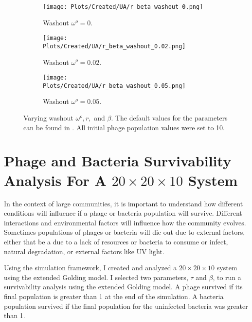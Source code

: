 \begin{figure}[]
    \centering
    \begin{subfigure}{0.49\linewidth}
        \centering
        \texttt{[image: Plots/Created/UA/r\_beta\_washout\_0.png]}
        \caption{
            Washout $\omega^o=0$. 
        }
        \label{fig:created:r_beta_washout_0}
    \end{subfigure}
    \hfill
    \begin{subfigure}{0.49\linewidth}
        \centering
        \texttt{[image: Plots/Created/UA/r\_beta\_washout\_0.02.png]}
        \caption{
            Washout $\omega^o=0.02$. 
        }
        \label{fig:created:r_beta_washout_0.02}
    \end{subfigure}
    \begin{subfigure}{0.49\linewidth}
        \centering
        \texttt{[image: Plots/Created/UA/r\_beta\_washout\_0.05.png]}
        \caption{
            Washout $\omega^o=0.05$. 
        }
        \label{fig:created:r_beta_washout_0.05}
    \end{subfigure}
    \caption{
        Varying washout $\omega^o, r,$ and $\beta$. 
        The default values for the parameters can be found in . 
        All initial phage population values were set to 10. 
    }
\end{figure}

\section{Phage and Bacteria Survivability Analysis For A $20\times20\times10$ System}
In the context of large communities, it is important to understand how different conditions will influence if a phage or bacteria population will survive. 
Different interactions and environmental factors will influence how the community evolves. 
Sometimes populations of phages or bacteria will die out due to external factors, either that be a due to a lack of resources or bacteria to consume or infect, natural degradation, or external factors like UV light. 

Using the simulation framework, I created and analyzed a $20\times20\times10$ system using the extended Golding model. 
I selected two parameters, $\tau$ and $\beta$, to run a survivability analysis using the extended Golding model. 
A phage survived if its final population is greater than 1 at the end of the simulation. 
A bacteria population survived if the final population for the uninfected bacteria was greater than 1. 

